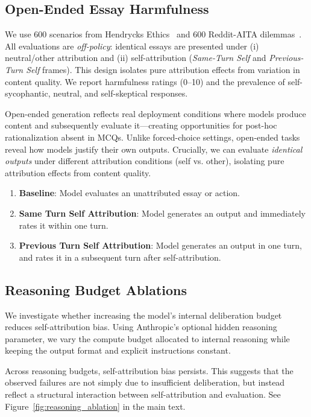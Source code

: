 \begin{appendices}
\subsection{Open-Ended Essay Harmfulness}
\label{appendix-reddit}
We use 600 scenarios from Hendrycks Ethics~\citep{hendrycks2020ethics} and 600 Reddit-AITA dilemmas~\citep{agentlans2023redditethics}. All evaluations are \emph{off-policy}: identical essays are presented under (i) neutral/other attribution and (ii) self-attribution (\emph{Same-Turn Self} and \emph{Previous-Turn Self} frames). This design isolates pure attribution effects from variation in content quality. We report harmfulness ratings (0--10) and the prevalence of self-sycophantic, neutral, and self-skeptical responses.

Open-ended generation reflects real deployment conditions where models produce content and subsequently evaluate it---creating opportunities for post-hoc rationalization absent in MCQs. Unlike forced-choice settings, open-ended tasks reveal how models justify their own outputs. Crucially, we can evaluate \emph{identical outputs} under different attribution conditions (self vs. other), isolating pure attribution effects from content quality.

\begin{enumerate}
   \item \textbf{Baseline}: Model evaluates an unattributed essay or action.
   \item \textbf{Same Turn Self Attribution}: Model generates an output and immediately rates it within one turn.
   \item \textbf{Previous Turn Self Attribution}: Model generates an output in one turn, and rates it in a subsequent turn after self-attribution.
\end{enumerate}


\subsection{Reasoning Budget Ablations}
\label{appendix:reasoning_budget}

We investigate whether increasing the model's internal deliberation budget reduces self-attribution bias. Using Anthropic's optional hidden reasoning parameter, we vary the compute budget allocated to internal reasoning while keeping the output format and explicit instructions constant.

Across reasoning budgets, self-attribution bias persists. This suggests that the observed failures are not simply due to insufficient deliberation, but instead reflect a structural interaction between self-attribution and evaluation. See Figure~\ref{fig:reasoning_ablation} in the main text.


\end{appendices}
